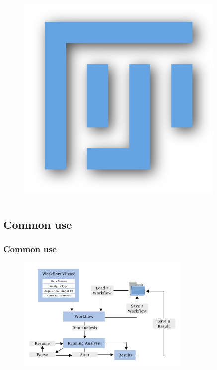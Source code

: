 \documentclass[aspectratio=169]{beamer}
\begin{document}
\begin{frame}
\begin{columns}[c]
\begin{figure}[h!]
    \centering	\includegraphics[width=0.9\textwidth]{./images/fiji.jpg} 
\end{figure} 


\end{columns}
\end{frame}


\subsection{Common use}
\begin{frame}
\frametitle{Common use}

\begin{figure}[h!]
    \centering	\includegraphics[width=0.75\textwidth]{./images/common_use.pdf} 
    \end{figure} 
 
\end{frame}
\end{document}
